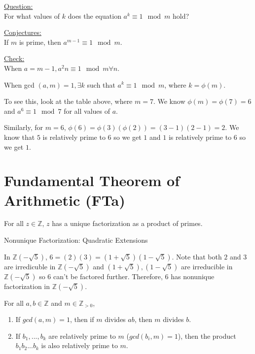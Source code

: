 \underline{Question:}\\
For what values of $k$ does the equation $a^k \equiv 1 \mod m$ hold?
\item
\underline{Conjectures:}\\
If $m$ is prime, then $a^{m-1} \equiv 1 \mod m$.
\item
\underline{Check:}\\
When $a=m-1, a^2n \equiv 1 \mod m \forall n$.
\item When gcd $(a, m) =1, \exists k$ such that $a^k \equiv 1 \mod m$, where $k= \phi (m)$. 
\item To see this, look at the table above, where $m=7$. We know $\phi (m)= \phi (7)=6$ and $a^6 \equiv 1 \mod 7$ for all values of $a$.
\item Similarly, for $m=6$, $\phi (6) = \phi (3)(\phi (2)) = (3-1)(2-1)=2$.
We know that $5$ is relatively prime to $6$ so we get $1$ and $1$ is relatively prime to $6$ so we get $1$.



\section{Fundamental Theorem of Arithmetic (FTa)}

For all $z \in \mathbb{Z}$, $z$ has a unique factorization as a product of primes.

\begin{example} Nonunique Factorization: Quadratic Extensions

In $\mathbb{Z}(-\sqrt{5})$, $6 = (2)(3) = (1 + \sqrt{5})(1 - \sqrt{5})$.
Note that both $2$ and $3$ are irredicuble in $\mathbb{Z}(-\sqrt{5})$ and $(1 + \sqrt{5}),(1 - \sqrt{5})$ are irreducible in $\mathbb{Z}(-\sqrt{5})$ so $6$ can't be factored further. Therefore, $6$ has nonunique factorization in $\mathbb{Z}(-\sqrt{5})$.
\end{example}

\begin{lemma} For all $a,b \in \mathbb{Z}$ and $m \in \mathbb{Z}_{>0}$,
\begin{enumerate}
\item If $gcd(a,m) = 1$, then if $m$ divides $ab$, then $m$ divides $b$. 
 \item If $b_1,...,b_k$ are relatively prime to $m$ ($gcd(b_i,m) = 1$), then the product $b_1b_2...b_k$ is also relatively prime to $m$.
\end{enumerate}
\end{lemma}

